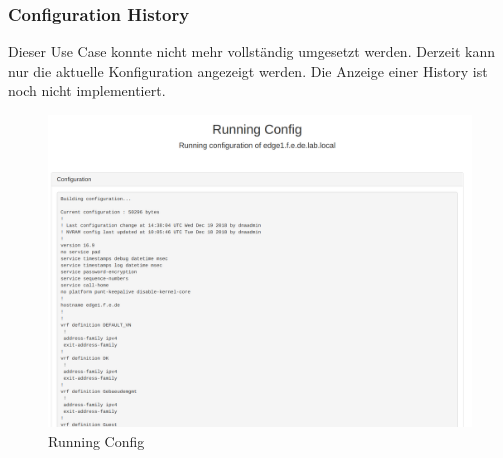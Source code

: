 \subsubsection{Configuration History}

Dieser Use Case konnte nicht mehr vollständig umgesetzt werden. Derzeit kann nur die aktuelle Konfiguration angezeigt werden. Die Anzeige einer History ist noch nicht implementiert.

\begin{figure}[H]
	\centering
	\includegraphics[width=0.8\linewidth]{img/Abstrahierung/running-config.png}
	\caption{Running Config}
	\label{fig:Running Config}
\end{figure}






